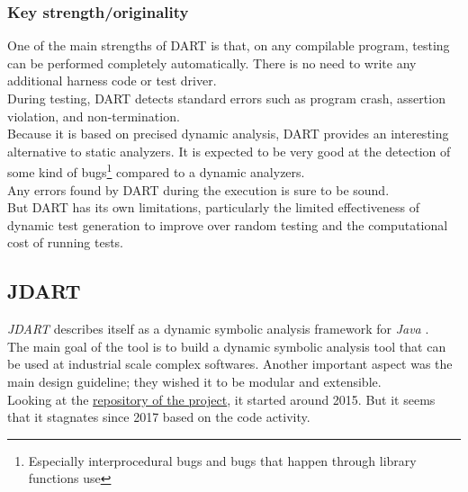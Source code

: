 \documentclass[11pt, conference]{IEEEtran}
\begin{document}
	    \subsubsection{Key strength/originality}
	    	One of the main strengths of DART is that, on any compilable program, testing can be performed completely automatically. There is no need to write any additional harness code or test driver.\\
	    	During testing, DART detects standard errors such as program crash, assertion violation, and non-termination.\\
	    	Because it is based on precised dynamic analysis, DART provides an interesting alternative to static analyzers. It is expected to be very good at the detection of some kind of bugs\footnote{Especially interprocedural bugs and bugs that happen through library functions use} compared to a dynamic analyzers.\\
	    	Any errors found by DART during the execution is sure to be sound.\\

	    	But DART has its own limitations, particularly the limited effectiveness of dynamic test generation to improve over random testing and the computational cost of running tests.

    \subsection{JDART}
  		\emph{JDART} describes itself as a dynamic symbolic analysis framework for \emph{Java} \cite{jDart}.\\
  		The main goal of the tool is to build a dynamic symbolic analysis tool that can be used at industrial scale complex softwares. Another important aspect was the main design guideline; they wished it to be modular and extensible.\\


  		Looking at the \href{https://github.com/psycopaths/jdart}{repository of the project}, it started around 2015. But it seems that it stagnates since 2017 based on the code activity.
\end{document}
